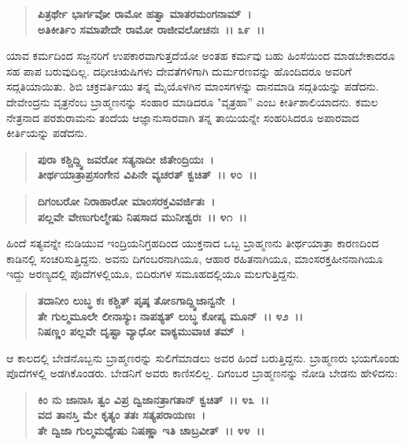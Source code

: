 \begin{verse}
\textbf{ಪಿತ್ರರ್ಥೇ ಭಾರ್ಗವೋ ರಾಮೋ ಹತ್ವಾ ಮಾತರಮಂಗನಾಮ್~।}\\\textbf{ಅತಿಕೀರ್ತಿಂ ಸಮಾಪೇದೇ ರಾಮೋ ರಾಜೀವಲೋಚನಃ~।। ೩೯~।।}
\end{verse}

ಯಾವ ಕರ್ಮದಿಂದ ಸಜ್ಜನರಿಗೆ ಉಪಕಾರವಾಗುತ್ತದೆಯೋ ಅಂತಹ ಕರ್ಮವು ಬಹು ಹಿಂಸೆಯಿಂದ ಮಾಡಬೇಕಾದರೂ ಸಹ ಪಾಪ ಬರುವುದಿಲ್ಲ. ದಧೀಚಿಋಷಿಗಳು ದೇವತೆಗಳಿಗಾಗಿ ದುರ್ಮರಣವನ್ನು ಹೊಂದಿದರೂ ಅವರಿಗೆ ಸದ್ಗತಿಯಾಯಿತು. ಶಿಬಿ ಚಕ್ರವರ್ತಿಯು ತನ್ನ ಮೈಯೊಳಗಿನ ಮಾಂಸಗಳನ್ನು ದಾನಮಾಡಿ ಸದ್ಗತಿಯನ್ನು ಪಡೆದನು. ದೇವೇಂದ್ರನು ವೃತ್ರನೆಂಬ ಬ್ರಾಹ್ಮಣನನ್ನು ಸಂಹಾರ ಮಾಡಿದರೂ "ವೃತ್ರಹಾ” ಎಂಬ ಕೀರ್ತಿಶಾಲಿಯಾದನು. ಕಮಲ ನೇತ್ರನಾದ ಪರಶುರಾಮನು ತಂದೆಯ ಆಜ್ಞಾನುಸಾರವಾಗಿ ತನ್ನ ತಾಯಿಯನ್ನೇ ಸಂಹರಿಸಿದರೂ ಅಪಾರವಾದ ಕೀರ್ತಿಯನ್ನು ಪಡೆದನು.

\begin{verse}
\textbf{ಪುರಾ ಕಶ್ಚಿದ್ದ್ವಿ ಜವರೋ ಸತ್ಯನಾದೀ ಜಿತೇಂದ್ರಿಯಃ~।}\\\textbf{ತೀರ್ಥಯಾತ್ರಾಪ್ರಸಂಗೇನ ವಿಪಿನೇ ವ್ಯಚರತ್ ಕ್ವಚಿತ್~।। ೪೦~।। }
\end{verse}

\begin{verse}
\textbf{ದಿಗಂಬರೋ ನಿರಾಹಾರೋ ಮಾಂಸರಕ್ತವಿವರ್ಜಿತಃ~।}\\\textbf{ಪಲ್ಲವೇ ವೇಣುಗುಲ್ಮೇಷು ನಿಷಸಾದ ಮುನೀಶ್ವರಃ~।। ೪೧~।।}
\end{verse}

ಹಿಂದೆ ಸತ್ಯವನ್ನೇ ನುಡಿಯುವ ಇಂದ್ರಿಯನಿಗ್ರಹದಿಂದ ಯುಕ್ತನಾದ ಒಬ್ಬ ಬ್ರಾಹ್ಮಣನು ತೀರ್ಥಯಾತ್ರಾ ಕಾರಣದಿಂದ ಕಾಡಿನಲ್ಲಿ ಸಂಚರಿಸುತ್ತಿದ್ದನು. ಅವನು ದಿಗಂಬರನಾಗಿಯೂ, ಆಹಾರ ರಹಿತನಾಗಿಯೂ, ಮಾಂಸರಕ್ತಹೀನನಾಗಿಯೂ ಇದ್ದು ಅರಣ್ಯದಲ್ಲಿ ಪೊದೆಗಳಲ್ಲಿಯೂ, ಬಿದಿರುಗಳ ಸಮೂಹದಲ್ಲಿಯೂ ಮಲಗುತ್ತಿದ್ದನು.

\begin{verse}
\textbf{ತದಾನೀಂ ಲುಬ್ಧ ಕಃ ಕಶ್ಚಿತ್ ಪೃಷ್ಠ ತೋಽಗಾದ್ದ್ವಿಜಾನ್ವನೇ~।}\\\textbf{ತೇ ಗುಲ್ಮಮೂಲೇ ಲೀನಾಸ್ಯುಃ ನಾಪಶ್ಯತ್ ಲುಬ್ಧ ಕೋಪ್ಯ ಮೂನ್~।। ೪೨~।।}\\\textbf{ನಿಷಣ್ಣಂ ಪಲ್ಲವೇ ದೃಷ್ಟಾ ವ್ಯಾಧೋ ವಾಕ್ಯಮುವಾಚ ತಮ್~।}
\end{verse}

ಆ ಕಾಲದಲ್ಲಿ ಬೇಡನೊಬ್ಬನು ಬ್ರಾಹ್ಮಣರನ್ನು ಸುಲಿಗೆಮಾಡಲು ಅವರ ಹಿಂದೆ ಬರುತ್ತಿದ್ದನು. ಬ್ರಾಹ್ಮಣರು ಭಯಗೊಂಡು ಪೊದೆಗಳಲ್ಲಿ ಅಡಗಿಕೊಂಡರು. ಬೇಡನಿಗೆ ಅವರು ಕಾಣಿಸಲಿಲ್ಲ. ದಿಗಂಬರ ಬ್ರಾಹ್ಮಣನನ್ನು ನೋಡಿ ಬೇಡನು ಹೇಳಿದನು:

\begin{verse}
\textbf{ಕಿಂ ನು ಜಾನಾಸಿ ತ್ವಂ ವಿಪ್ರ ದ್ವಿಜಾನತ್ರಾಗತಾನ್ ಕ್ವಚಿತ್~।। ೪೩~।।}\\\textbf{ವದ ತಾನಸ್ತಿ ಮೇ ಕೃತ್ಯಂ ತತಃ ಸತ್ಯಪರಾಯಣಃ~। }\\\textbf{ತೇ ದ್ವಿಜಾ ಗುಲ್ಮಮಧ್ಯೇಷು ನಿಷಣ್ಣಾ ಇತಿ ಚಾಬ್ರವೀತ್~।। ೪೪~।।}
\end{verse}

